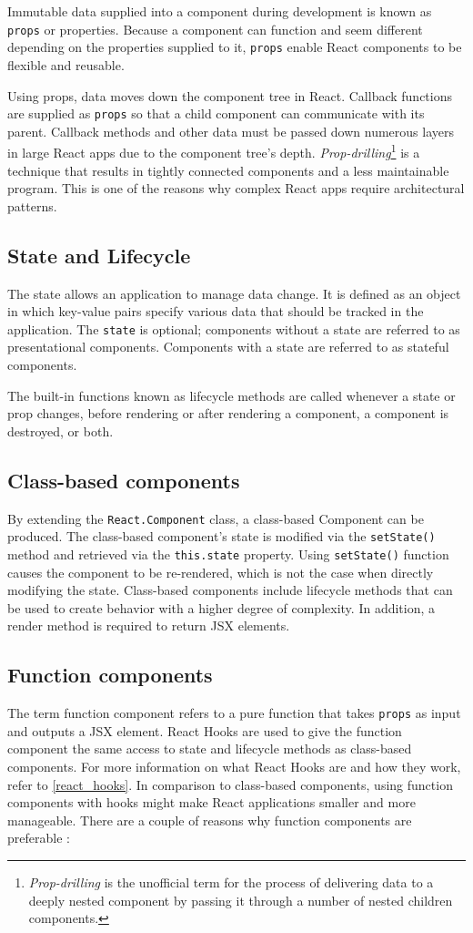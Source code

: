 Immutable data supplied into a component during development is known as \texttt{props} or properties. Because a component can function and seem different depending on the properties supplied to it, \texttt{props} enable React components to be flexible and reusable.

Using props, data moves down the component tree in React. Callback functions are supplied as \texttt{props} so that a child component can communicate with its parent. Callback methods and other data must be passed down numerous layers in large React apps due to the component tree's depth. \emph{Prop-drilling}\footnote{\emph{Prop-drilling} is the unofficial term for the process of delivering data to a deeply nested component by passing it through a number of nested children components.} is a technique that results in tightly connected components and a less maintainable program. This is one of the reasons why complex React apps require architectural patterns.

\subsection{State and Lifecycle}
The state allows an application to manage data change. It is defined as an object in which key-value pairs specify various data that should be tracked in the application. The \texttt{state} is optional; components without a state are referred to as presentational components. Components with a state are referred to as stateful components.

The built-in functions known as lifecycle methods are called whenever a state or prop changes, before rendering or after rendering a component, a component is destroyed, or both.

\subsection{Class-based components}
By extending the \texttt{React.Component} class, a class-based Component can be produced. The class-based component's state is modified via the \texttt{setState()} method and retrieved via the \texttt{this.state} property. Using \texttt{setState()} function causes the component to be re-rendered, which is not the case when directly modifying the state. Class-based components include lifecycle methods that can be used to create behavior with a higher degree of complexity. In addition, a render method is required to return JSX elements.


\subsection{Function components}
The term function component refers to a pure function that takes \texttt{props} as input and outputs a JSX element. React Hooks are used to give the function component the same access to state and lifecycle methods as class-based components. For more information on what React Hooks are and how they work, refer to \autoref{react_hooks}. In comparison to class-based components, using function components with hooks might make React applications smaller and more manageable. There are a couple of reasons why function components are preferable \autocite{phan2020react}:


